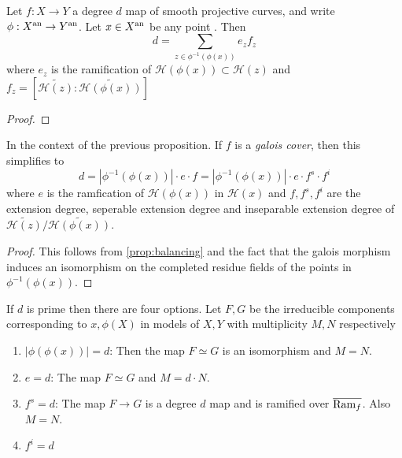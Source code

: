 \begin{proposition}\label{prop:balancing}
	Let $f: X \to Y$ a degree $d$ map of smooth projective curves, and write $\phi: X{}^{\text{an}} \to Y{}^{\text{an}}$. 
	Let $x \in X{}^{\text{an}}$ be any point . 
	Then \[
		d = \sum_{z \in \phi^{-1}(\phi(x))} e_z f_z 
	\]
	where $e_z$ is the ramification of $\mathcal{H} (\phi(x)) \subset  \mathcal{H} (z)$ and $f_z = \left[\widetilde{\mathcal{H} (z)}: \widetilde{\mathcal{H} (\phi(x))}\right]$
\end{proposition}
\begin{proof}
\end{proof}

\begin{corollary}\label{cor:balancing_galois}
	In the context of the previous proposition. 
	If $f$ is a \emph{galois cover}, then this simplifies to \begin{equation}
		d = |\phi^{-1}(\phi(x))|\cdot  e\cdot f = |\phi^{-1}(\phi(x))|\cdot  e \cdot f^{s} \cdot  f^{i}
	\end{equation} 
	where $e$ is the ramfication of $\mathcal{H} (\phi(x))$ in $\mathcal{H}(x) $ and $f, f^{s}, f^{i}$ are the extension degree, seperable extension degree and inseparable extension degree of $\widetilde{\mathcal{H} (z)} / \widetilde{\mathcal{H} (\phi(x))}$.
\end{corollary}
\begin{proof}
	This follows from \cref{prop:balancing} and the fact that the galois morphism induces an isomorphism on the completed residue fields of the points in $\phi^{-1}(\phi(x))$.
\end{proof}

If $d$ is prime then there are four options. Let $F, G$ be the irreducible components corresponding to $x, \phi(X)$ in models of $X, Y$ with multiplicity $M, N$ respectively
\begin{enumerate}
	\item $|\phi(\phi(x))| = d$: Then the map $F \simeq G$ is an isomorphism and $M = N$.
	\item $e = d$: The map $F \simeq G$ and $M = d\cdot N$. 
	\item $f^{s} = d$: The map $F \to G$ is a degree $d$ map and is ramified over $\overline{\operatorname{Ram}_f}$. Also $M = N$. 
	\item  $f^{i} = d$
\end{enumerate}


